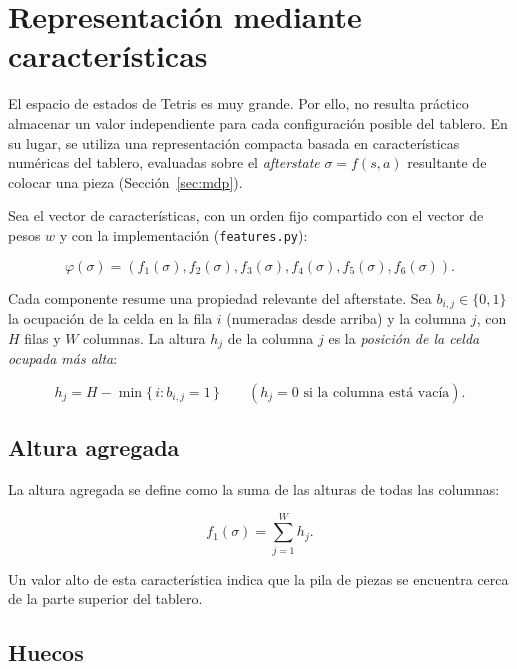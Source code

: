 \section{Representación mediante características}
\label{sec:caracteristicas}

El espacio de estados de Tetris es muy grande. Por ello, no resulta práctico almacenar un valor independiente para cada configuración posible del tablero. En su lugar, se utiliza una representación compacta basada en características numéricas del tablero, evaluadas sobre el \emph{afterstate} $\sigma = f(s,a)$ resultante de colocar una pieza (Sección~\ref{sec:mdp}).

Sea el vector de características, con un orden fijo compartido con el vector de pesos $w$ y con la implementación (\texttt{features.py}):

\begin{equation}
    \varphi(\sigma) =
    (f_1(\sigma), f_2(\sigma), f_3(\sigma), f_4(\sigma), f_5(\sigma), f_6(\sigma)).
\end{equation}

Cada componente resume una propiedad relevante del afterstate. Sea $b_{i,j}\in\{0,1\}$ la ocupación de la celda en la fila $i$ (numeradas desde arriba) y la columna $j$, con $H$ filas y $W$ columnas. La altura $h_j$ de la columna $j$ es la \emph{posición de la celda ocupada más alta}:

\begin{equation}
    h_j = H - \min\{\, i : b_{i,j} = 1 \,\}
    \qquad (h_j = 0 \text{ si la columna está vacía}).
\end{equation}

\subsection{Altura agregada}

La altura agregada se define como la suma de las alturas de todas las columnas:

\begin{equation}
    f_1(\sigma) =
    \sum_{j=1}^{W} h_j.
\end{equation}

Un valor alto de esta característica indica que la pila de piezas se encuentra cerca de la parte superior del tablero.

\subsection{Huecos}


